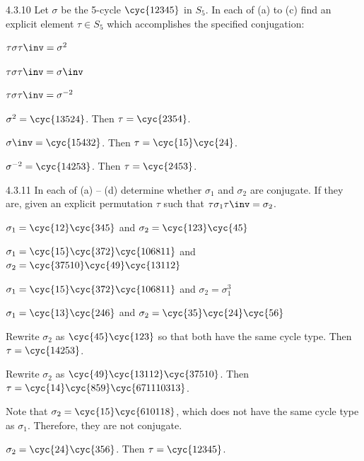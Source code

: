\begin{exercise}{4.3.10}
	Let $\sigma$ be the 5-cycle $\cyc{1 2 3 4 5}$ in $S_5$.
	In each of (a) to (c) find an explicit element $\tau \in S_5$ which accomplishes the specified conjugation:
	\begin{subexercises}
		\item $\tau \sigma \tau\inv = \sigma^2$
		\item $\tau \sigma \tau\inv = \sigma\inv$
		\item $\tau \sigma \tau\inv = \sigma^{-2}$
	\end{subexercises}
\end{exercise}

\begin{solenum}
	\item $\sigma^2 = \cyc{1 3 5 2 4}$.
	Then $\tau = \cyc{2 3 5 4}$.
	\item $\sigma\inv = \cyc{1 5 4 3 2}$.
	Then $\tau = \cyc{1 5}\cyc{2 4}$.
	\item $\sigma^{-2} = \cyc{1 4 2 5 3}$.
	Then $\tau = \cyc{2 4 5 3}$.
\end{solenum}

\begin{exercise}{4.3.11}
	In each of (a) -- (d) determine whether $\sigma_1$ and $\sigma_2$ are conjugate.
	If they are, given an explicit permutation $\tau$ such that $\tau \sigma_1 \tau\inv = \sigma_2$.
	\begin{subexercises}
		\item $\sigma_1 = \cyc{1 2}\cyc{3 4 5}$ and $\sigma_2 = \cyc{1 2 3}\cyc{4 5}$
		\item $\sigma_1 = \cyc{1 5}\cyc{3 7 2}\cyc{10 6 8 11}$ and $\sigma_2 = \cyc{3 7 5 10}\cyc{4 9}\cyc{13 11 2}$
		\item $\sigma_1 = \cyc{1 5}\cyc{3 7 2}\cyc{10 6 8 11}$ and $\sigma_2 = \sigma_1^3$
		\item $\sigma_1 = \cyc{1 3}\cyc{2 4 6}$ and $\sigma_2 = \cyc{3 5}\cyc{2 4}\cyc{5 6}$
	\end{subexercises}
\end{exercise}

\begin{solenum}
	\item Rewrite $\sigma_2$ as $\cyc{4 5}\cyc{1 2 3}$ so that both have the same cycle type.
	Then $\tau = \cyc{1 4 2 5 3}$.
	\item Rewrite $\sigma_2$ as $\cyc{4 9}\cyc{13 11 2}\cyc{3 7 5 10}$.
	Then $\tau = \cyc{1 4}\cyc{8 5 9}\cyc{6 7 11 10 3 13}$.
	\item Note that $\sigma_2 = \cyc{1 5}\cyc{6 10 11 8}$, which does not have the same cycle type as $\sigma_1$.
	Therefore, they are not conjugate.
	\item $\sigma_2 = \cyc{2 4}\cyc{3 5 6}$.
	Then $\tau = \cyc{1 2 3 4 5}$.
\end{solenum}

